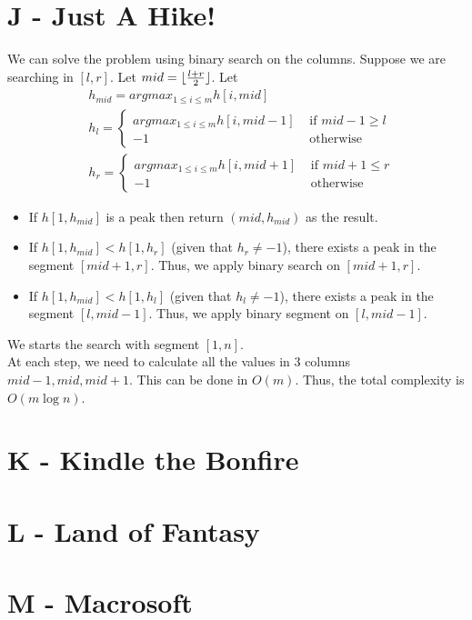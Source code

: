 \documentclass{article}
\DeclarePairedDelimiter\floor{\lfloor}{\rfloor}
\begin{document}
\section*{J - Just A Hike!}
We can solve the problem using binary search on the columns. Suppose we are searching in $[l, r]$. 
Let $mid = \floor{\frac{l + r}{2}}$. Let 
\begin{equation}
\begin{split}
&h_{mid} = argmax_{1 \leq i \leq m} h[i, mid]\\
&h_l = 
\begin{cases}
argmax_{1 \leq i \leq m} h[i, mid - 1] & \text{ if $mid - 1 \geq l$}\\
-1 & \text{ otherwise}
\end{cases}\\
&h_r = 
\begin{cases}
argmax_{1 \leq i \leq m} h[i, mid + 1] & \text{ if $mid + 1 \leq r$}\\
-1 & \text{ otherwise}
\end{cases}
\end{split}
\end{equation}
\begin{itemize}
\item
If $h[1, h_{mid}]$ is a peak then return $(mid, h_{mid})$ as the result.
\item
If $h[1, h_{mid}] < h[1, h_r]$ (given that $h_r \neq -1$), there exists a peak in the segment $[mid + 1, r]$. Thus,
we apply binary search on $[mid + 1, r]$.
\item
If $h[1, h_{mid}] < h[1, h_l]$ (given that $h_l \neq -1$), there exists a peak in the segment $[l, mid - 1]$. Thus, we apply binary segment on $[l, mid - 1]$.
\end{itemize}
We starts the search with segment $[1, n]$.\\

\noindent At each step, we need to calculate all the values in $3$ columns $mid - 1, mid, mid + 1$. This can be done in $O(m)$. Thus, the total complexity is $O(m\log{n})$.

\section*{K - Kindle the Bonfire}



\section{L - Land of Fantasy}



\section{M - Macrosoft}
\end{document}
